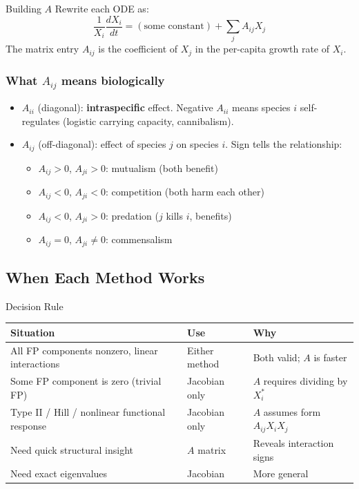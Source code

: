 \documentclass[11pt]{article}
\begin{document}
\begin{conceptbox}{Building $A$}
Rewrite each ODE as:
\[
\frac{1}{X_i}\frac{dX_i}{dt} = (\text{some constant}) + \sum_j A_{ij} X_j
\]
The matrix entry $A_{ij}$ is the coefficient of $X_j$ in the per-capita growth rate of $X_i$.
\end{conceptbox}

\subsubsection{What $A_{ij}$ means biologically}
\begin{itemize}
\item $A_{ii}$ (diagonal): \textbf{intraspecific} effect. Negative $A_{ii}$ means species $i$ self-regulates (logistic carrying capacity, cannibalism).
\item $A_{ij}$ (off-diagonal): effect of species $j$ on species $i$. Sign tells the relationship:
  \begin{itemize}
  \item $A_{ij} > 0$, $A_{ji} > 0$: mutualism (both benefit)
  \item $A_{ij} < 0$, $A_{ji} < 0$: competition (both harm each other)
  \item $A_{ij} < 0$, $A_{ji} > 0$: predation ($j$ kills $i$, benefits)
  \item $A_{ij} = 0$, $A_{ji} \neq 0$: commensalism
  \end{itemize}
\end{itemize}

\subsection{When Each Method Works}

\begin{summarybox}{Decision Rule}
\renewcommand{\arraystretch}{1.4}
\begin{tabular}{p{6.5cm}p{4cm}p{3.5cm}}
\toprule
\textbf{Situation} & \textbf{Use} & \textbf{Why}\\
\midrule
All FP components nonzero, linear interactions & Either method & Both valid; $A$ is faster\\
Some FP component is zero (trivial FP) & Jacobian only & $A$ requires dividing by $X_i^*$\\
Type II / Hill / nonlinear functional response & Jacobian only & $A$ assumes form $A_{ij}X_iX_j$\\
Need quick structural insight & $A$ matrix & Reveals interaction signs\\
Need exact eigenvalues & Jacobian & More general\\
\bottomrule
\end{tabular}
\end{summarybox}
\end{document}
